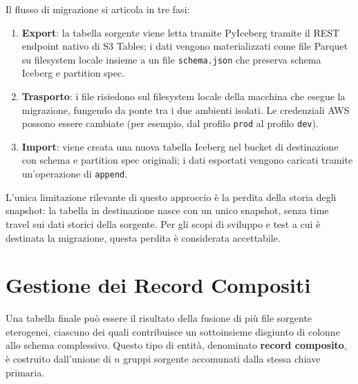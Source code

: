 \documentclass[12pt,a4paper,openright,twoside]{book}
\begin{document}
Il flusso di migrazione si articola in tre fasi:

\begin{enumerate}
    \item \textbf{Export}: la tabella sorgente viene letta tramite PyIceberg tramite il REST endpoint nativo di S3 Tables; i dati vengono materializzati come file Parquet su filesystem locale insieme a un file \texttt{schema.json} che preserva schema Iceberg e partition spec.
    \item \textbf{Trasporto}: i file risiedono sul filesystem locale della macchina che esegue la migrazione, fungendo da ponte tra i due ambienti isolati. Le credenziali AWS possono essere cambiate (per esempio, dal profilo \texttt{prod} al profilo \texttt{dev}).
    \item \textbf{Import}: viene creata una nuova tabella Iceberg nel bucket di destinazione con schema e partition spec originali; i dati esportati vengono caricati tramite un'operazione di \texttt{append}.
\end{enumerate}

L'unica limitazione rilevante di questo approccio è la perdita della storia degli snapshot: la tabella in destinazione nasce con un unico snapshot, senza time travel sui dati storici della sorgente. Per gli scopi di sviluppo e test a cui è destinata la migrazione, questa perdita è considerata accettabile.

\newpage
\section{Gestione dei Record Compositi}
\label{sec:record-compositi}

Una tabella finale può essere il risultato della fusione di più file sorgente eterogenei, ciascuno dei quali contribuisce un sottoinsieme disgiunto di colonne allo schema complessivo. 
Questo tipo di entità, denominato \textbf{record composito}, è costruito dall'unione di $n$ gruppi sorgente accomunati dalla stessa chiave primaria.
\end{document}
